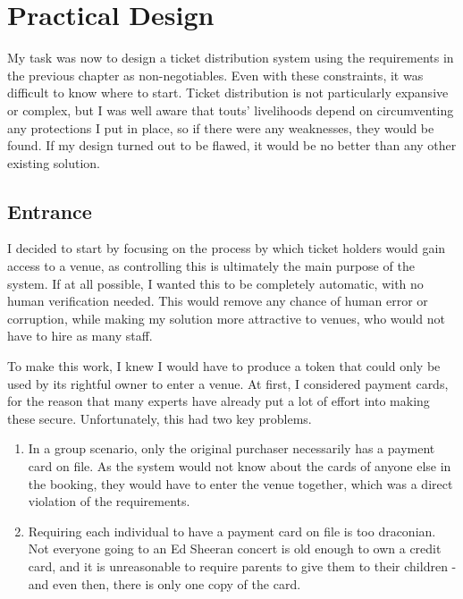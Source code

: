 \documentclass[12pt,a4paper]{bhamdissertation}
\begin{document}
\chapter{Practical Design} \label{practical_design}

My task was now to design a ticket distribution system using the requirements in the previous chapter as non-negotiables. Even with these constraints, it was difficult to know where to start. Ticket distribution is not particularly expansive or complex, but I was well aware that touts' livelihoods depend on circumventing any protections I put in place, so if there were any weaknesses, they would be found. If my design turned out to be flawed, it would be no better than any other existing solution.

\section{Entrance}

I decided to start by focusing on the process by which ticket holders would gain access to a venue, as controlling this is ultimately the main purpose of the system. If at all possible, I wanted this to be completely automatic, with no human verification needed. This would remove any chance of human error or corruption, while making my solution more attractive to venues, who would not have to hire as many staff.

To make this work, I knew I would have to produce a token that could only be used by its rightful owner to enter a venue. At first, I considered payment cards, for the reason that many experts have already put a lot of effort into making these secure. Unfortunately, this had two key problems.

\begin{enumerate}
    \item In a group scenario, only the original purchaser necessarily has a payment card on file. As the system would not know about the cards of anyone else in the booking, they would have to enter the venue together, which was a direct violation of the requirements.
    \item Requiring each individual to have a payment card on file is too draconian. Not everyone going to an Ed Sheeran concert is old enough to own a credit card, and it is unreasonable to require parents to give them to their children - and even then, there is only one copy of the card.
\end{enumerate}
\end{document}
